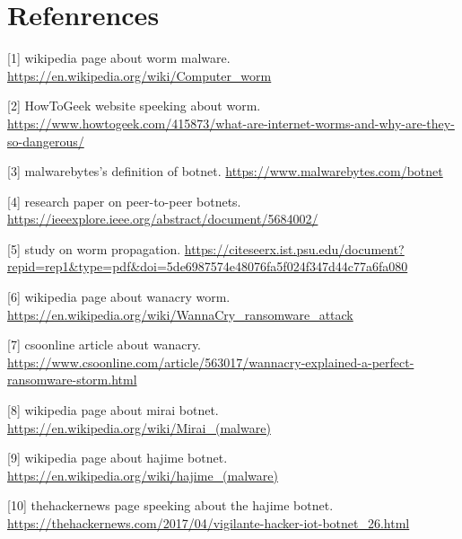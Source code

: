 \documentclass[../main.tex]{subfiles}
\begin{document}
	\chapter*{Refenrences}
	{

        [1] wikipedia page about worm malware. \url{https://en.wikipedia.org/wiki/Computer_worm}

        [2] HowToGeek website speeking about worm.
        \url{https://www.howtogeek.com/415873/what-are-internet-worms-and-why-are-they-so-dangerous/}

        [3] malwarebytes's definition of botnet.
        \url{https://www.malwarebytes.com/botnet}

        [4] research paper on peer-to-peer botnets.
        \url{https://ieeexplore.ieee.org/abstract/document/5684002/}

        [5] study on worm propagation.
        \url{https://citeseerx.ist.psu.edu/document?repid=rep1&type=pdf&doi=5de6987574e48076fa5f024f347d44c77a6fa080}

        [6] wikipedia page about wanacry worm.
        \url{https://en.wikipedia.org/wiki/WannaCry_ransomware_attack}

        [7] csoonline article about wanacry.
        \url{https://www.csoonline.com/article/563017/wannacry-explained-a-perfect-ransomware-storm.html}

        [8] wikipedia page about mirai botnet.
        \url{https://en.wikipedia.org/wiki/Mirai_(malware)}

        [9] wikipedia page about hajime botnet.
        \url{https://en.wikipedia.org/wiki/hajime_(malware)}

        [10] thehackernews page speeking about the hajime botnet.
        \url{https://thehackernews.com/2017/04/vigilante-hacker-iot-botnet_26.html}

		\vspace{10pt}

	}
\end{document}
